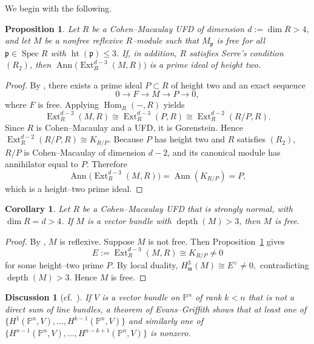 \documentclass[11pt,a4paper]{amsart}
\numberwithin{equation}{section}
\newtheorem{proposition}[theorem]{Proposition}
\newtheorem{corollary}[theorem]{Corollary}
\newtheorem{discussion}[theorem]{Discussion}
\DeclareMathOperator{\Ann}{Ann}\DeclareMathOperator{\ann}{Ann}
\DeclareMathOperator{\Spec}{Spec}
\DeclareMathOperator{\Ext}{Ext}
\DeclareMathOperator{\Hom}{Hom}
\DeclareMathOperator{\depth}{depth}
\newcommand{\fm}{\mathfrak{m}}
\newcommand{\fp}{\mathfrak{p}}
\begin{document}
We begin with the following.

\begin{proposition}\label{dv}
	Let $R$ be a Cohen–Macaulay UFD of dimension $d:=\dim R>4$, and let $M$ be a nonfree reflexive $R$–module such that $M_\fp$ is free for all $\fp\in\Spec R$ with $\operatorname{ht}(\fp)\le 3$. If, in addition, $R$ satisfies Serre’s condition $(R_2)$, then
	\(
	\Ann\!\big(\Ext^{d-3}_R(M,R)\big)
	\)
	is a prime ideal of height two.
\end{proposition}

\begin{proof}
	By \cite[Theorem 2.17]{syz}, there exists a prime ideal $P\subset R$ of height two and an exact sequence
	\[
	0 \longrightarrow F \longrightarrow M \longrightarrow P \longrightarrow 0,
	\]
	where $F$ is free. Applying $\Hom_R(-,R)$ yields
	\[
	\Ext^{d-3}_R(M,R)\cong \Ext^{d-3}_R(P,R)\cong \Ext^{d-2}_R(R/P,R).
	\]
	Since $R$ is Cohen–Macaulay and a UFD, it is Gorenstein. Hence
	\(
	\Ext^{d-2}_R(R/P,R)\cong K_{R/P} 
	\). Because $P$ has height two and $R$ satisfies $(R_2)$, $R/P$ is Cohen–Macaulay of dimension $d-2$, and its canonical module has annihilator equal to $P$. Therefore
	\[
	\Ann\!\big(\Ext^{d-3}_R(M,R)\big)=\Ann(K_{R/P})=P,
	\]
	which is a height–two prime ideal.
\end{proof}

\begin{corollary}
	Let $R$ be a Cohen–Macaulay UFD that is strongly normal, with $\dim R=d>4$. If $M$ is a vector bundle with $\depth(M)>3$, then $M$ is free.
\end{corollary}

\begin{proof}
	By \cite[Proposition 1.4.1(b)]{BH}, $M$ is reflexive. Suppose $M$ is not free. Then Proposition~\ref{dv} gives
	\[
	E:=\Ext^{d-3}_R(M,R)\cong K_{R/P}\neq 0
	\]
	for some height–two prime $P$. By local duality,
	\(
	H^3_{\fm}(M)\cong E^{\vee}\neq 0,
	\)
	contradicting $\depth(M)>3$. Hence $M$ is free.
\end{proof}

\begin{discussion}[cf.\ \cite{syz}]
	If $V$ is a vector bundle on $\mathbb{P}^n$ of rank $k<n$ that is not a direct sum of line bundles, a theorem of Evans–Griffith shows that at least one of
	\(
\{	H^1(\mathbb{P}^n,V),\dots,H^{k-1}(\mathbb{P}^n,V)\}
	\)
	and similarly one of
	\(
\{	H^{n-1}(\mathbb{P}^n,V),\dots,H^{n-k+1}(\mathbb{P}^n,V)\}
	\)
	is nonzero.
\end{discussion}
\end{document}
